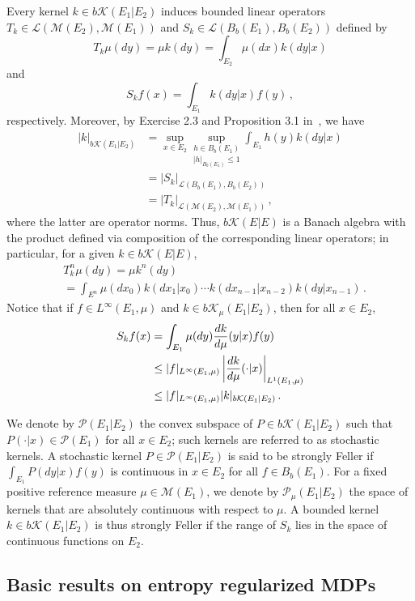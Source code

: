 \documentclass{amsart}
\theoremstyle{definition}
\begin{document}
Every kernel $k\in b\mathcal{K}(E_1|E_2)$ induces bounded linear operators $T_k \in \mathcal{L}(\mathcal{M}(E_2),\mathcal{M}(E_1))$ and $S_k \in \mathcal{L}(B_b(E_1),B_b(E_2))$ defined by
\[
T_k\mu(dy)=\mu k(dy)=\int_{E_2}\mu(dx)k(dy|x)
\]
and 
\[
S_kf(x)=\int_{E_1}k(dy|x)f(y)\,,
\]
respectively.
Moreover, by Exercise 2.3 and Proposition 3.1 in~\cite{kunze2011pettis}, we have
\begin{align*}
|k|_{b\mathcal{K}(E_1|E_2)}&=\sup_{x\in E_2}\underset{|h|_{B_b(E_1)}\le 1}{\sup_{h\in B_b(E_1)}}\int_{E_1}h(y)k(dy|x)\\
&=|S_k|_{\mathcal{L}(B_b(E_1),B_b(E_2))}\\
&=|T_k|_{\mathcal{L}(\mathcal{M}(E_2),\mathcal{M}(E_1))}\,,
\end{align*}
where the latter are operator norms. 
Thus, $b\mathcal{K}(E|E)$ is a Banach algebra with the product defined via composition of the corresponding linear operators; in particular, for a given $k\in b\mathcal{K}(E|E)$,
\[
\begin{split}
& T_k^n\mu(dy)=\mu k^n(dy)\\
& = \int_{E^{n}}\mu(dx_0)k(dx_1|x_0)\cdots k(dx_{n-1}|x_{n-2}) k(dy|x_{n-1})\,.
\end{split}
\]
Notice that if $f\in L^\infty(E_1,\mu)$ and $k\in b\mathcal{K}_{\mu}(E_1|E_2)$, then for all $x\in E_2$,
\begin{align}
S_kf(x)&=\int_{E_1}\mu(dy)\frac{dk}{d\mu}(y|x)f(y)\notag\\
&\le |f|_{L^\infty(E_1,\mu)} \left|\frac{dk}{d\mu}(\cdot|x)\right|_{L^1(E_1,\mu)}\notag \\
&\le |f|_{L^\infty(E_1,\mu)} |k|_{b\mathcal{K}(E_1|E_2)}\,. \label{ineq:app:essup_kernel}
\end{align}

We denote by $\mathcal{P}(E_1|E_2)$ the convex subspace of $P\in b\mathcal{K}(E_1|E_2)$ such that $P(\cdot|x)\in \mathcal{P}(E_1)$ for all $x\in E_2$; such kernels are referred to as stochastic kernels. 
A stochastic kernel $P\in \mathcal{P}(E_1|E_2)$ is said to be strongly Feller if $\int_{E_1}P(dy|x)f(y)$ is continuous in $x\in E_2$ for all $f\in B_b(E_1)$. For a fixed positive reference measure $\mu \in \mathcal{M}(E_1)$, we denote by $\mathcal{P}_{\mu}(E_1|E_2)$ the space of kernels that are absolutely continuous with respect to $\mu$. 
A bounded kernel $k\in b\mathcal{K}(E_1|E_2)$ is thus strongly Feller if the range of $S_k$ lies in the space of continuous functions on $E_2$. 

\subsection{Basic results on entropy regularized MDPs}
\end{document}
